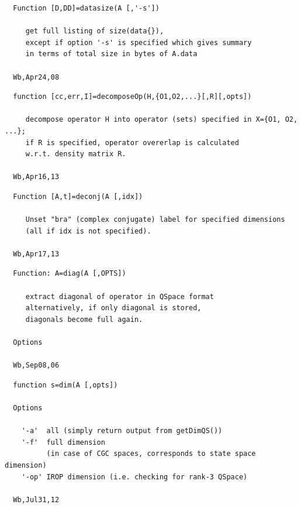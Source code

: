 \documentclass[twoside,12pt]{article}
\begin{document}
\begin{verbatim}
  Function [D,DD]=datasize(A [,'-s'])
 
     get full listing of size(data{}),
     except if option '-s' is specified which gives summary 
     in terms of total size in bytes of A.data
 
  Wb,Apr24,08
\end{verbatim}

\pagebreak[3]



\begin{verbatim}
  function [cc,err,I]=decomposeOp(H,{O1,O2,...}[,R][,opts])
 
     decompose operator H into operator (sets) specified in X={O1, O2, ...};
     if R is specified, operator overerlap is calculated
     w.r.t. density matrix R.
 
  Wb,Apr16,13
\end{verbatim}

\pagebreak[3]



\begin{verbatim}
  Function [A,t]=deconj(A [,idx])
 
     Unset "bra" (complex conjugate) label for specified dimensions
     (all if idx is not specified).
 
  Wb,Apr17,13
\end{verbatim}

\pagebreak[3]



\begin{verbatim}
  Function: A=diag(A [,OPTS])
 
     extract diagonal of operator in QSpace format
     alternatively, if only diagonal is stored,
     diagonals become full again.
 
  Options
 
  Wb,Sep08,06
\end{verbatim}

\pagebreak[3]



\begin{verbatim}
  function s=dim(A [,opts])
 
  Options
 
    '-a'  all (simply return output from getDimQS())
    '-f'  full dimension
          (in case of CGC spaces, corresponds to state space dimension)
    '-op' IROP dimension (i.e. checking for rank-3 QSpace)
 
  Wb,Jul31,12
\end{verbatim}
\end{document}
